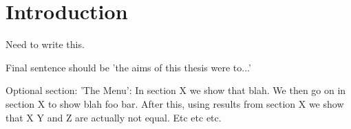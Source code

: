 
\chapter{Introduction}
\label{chap:introduction}

Need to write this.

Final sentence should be 'the aims of this thesis were to...'

Optional section: 'The Menu': In section X we show that blah.
We then go on in section X to show blah foo bar.
After this, using results from section X we show that X Y and Z are actually not equal.
Etc etc etc.
